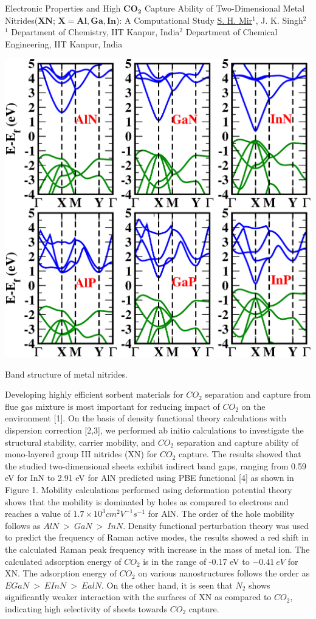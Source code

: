 
    \begin{abstract_online}{Electronic Properties and High $\mathbf{CO_2}$ Capture Ability of Two-Dimensional Metal Nitrides($\mathbf{XN}$; $\mathbf{X = Al, Ga, In}$): A Computational Study}{%
        \underline{S. H. Mir}$^{1}$, J. K. Singh$^{2}$}{%
        }{%
        $^1$ Department of Chemistry, IIT Kanpur, India\newline{}$^2$ Department of Chemical Engineering, IIT Kanpur, India}
    \begin{center}  \includegraphics[width=0.6\linewidth]{abstracts/txt/figures/showkat.png}  \caption{Band structure of metal nitrides.}  \end{center} Developing highly efficient sorbent materials for $CO_2$ separation and capture from flue gas mixture is most important for reducing impact of $CO_2$ on the environment [1]. On the basis of density functional theory calculations with dispersion correction [2,3], we performed ab initio calculations to investigate the structural stability, carrier mobility, and $CO_2$ separation and capture ability of mono-layered group III nitrides (XN) for $CO_2$ capture. The results showed that the studied two-dimensional sheets exhibit indirect band gaps, ranging from 0.59 eV for InN to 2.91 eV for AlN predicted using PBE functional [4] as shown in Figure 1. Mobility calculations performed using deformation potential theory shows that the mobility is dominated by holes as compared to electrons and reaches a value of $1.7 \times 10^3 cm^2 V^{−1} s^{−1}$ for AlN. The order of the hole mobility follows as $AlN \ > \ GaN \ > \ InN$. Density functional perturbation theory was used to predict the frequency of Raman active modes, the results showed a red shift in the calculated Raman peak frequency with increase in the mass of metal ion. The calculated adsorption energy of $CO_2$ is in the range of -0.17 eV to $-0.41 \ eV$ for XN. The adsorption energy of $CO_2$ on various nanostructures follows the order as $EGaN \ > \  EInN \ > \ EalN$. On the other hand, it is seen that $N_2$ shows significantly weaker interaction with the surfaces of XN as compared to $CO_2$, indicating high selectivity of sheets towards $CO_2$ capture. 
    

\end{abstract_online}
